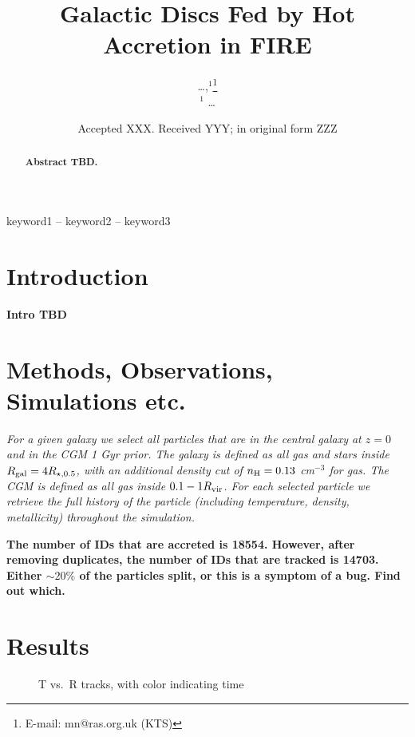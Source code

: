 \documentclass[fleqn,usenatbib]{mnras}
\title[Hot Accretion in FIRE]{Galactic Discs Fed by Hot Accretion in FIRE}
\author[\ldots]{
\ldots,$^{1}$\thanks{E-mail: mn@ras.org.uk (KTS)}
\\
$^1$ \ldots
}
\date{Accepted XXX. Received YYY; in original form ZZZ}
\begin{document}
\label{firstpage}
\pagerange{\pageref{firstpage}--\pageref{lastpage}}
\maketitle

\begin{abstract}
\textbf{Abstract TBD.}
\end{abstract}

\begin{keywords}
keyword1 -- keyword2 -- keyword3
\end{keywords}



\section{Introduction}

\textbf{Intro TBD}

\section{Methods, Observations, Simulations etc.}

\textit{
For a given galaxy we select all particles that are in the central galaxy at $z=0$ and in the CGM 1 Gyr prior.
The galaxy is defined as all gas and stars inside $R_{\rm gal} = 4 R_{\star,0.5}$, with an additional density cut of $n_{\rm H} = 0.13$ cm$^{-3}$ for gas.
The CGM is defined as all gas inside $0.1 -1 R_{\rm vir}$.
For each selected particle we retrieve the full history of the particle (including temperature, density, metallicity) throughout the simulation.
}

\textbf{The number of IDs that are accreted is 18554.
However, after removing duplicates, the number of IDs that are tracked is 14703.
Either $\sim20\%$ of the particles split, or this is a symptom of a bug.
Find out which.}

\section{Results}


\begin{figure}
    \centering
    \caption{T vs.\ R tracks, with color indicating time}
    \label{f: T vs R}
\end{figure}
\end{document}
